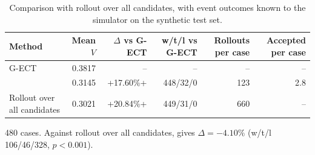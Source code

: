 \begin{table}
\centering
\begin{threeparttable}
\caption{Comparison with rollout over all candidates, with event outcomes known to the simulator on the synthetic test set.}
\label{tab:v9-reference}
\footnotesize
\setlength{\tabcolsep}{4pt}
\begin{tabular*}{\textwidth}{@{\extracolsep{\fill}}lrrrrr@{}}
\toprule
Method & Mean $V$ & $\Delta$ vs G-ECT & w/t/l vs G-ECT & Rollouts per case & Accepted per case \\
\midrule
G-ECT & 0.3817 & -- & -- & -- & -- \\
\pgnd{} & 0.3145 & +17.60\%+ & 448/32/0 & 123 & 2.8 \\
Rollout over all candidates & 0.3021 & +20.84\%+ & 449/31/0 & 660 & -- \\
\bottomrule
\end{tabular*}
\begin{tablenotes}\footnotesize
\item 480 cases. Against rollout over all candidates, \pgnd{} gives $\Delta=-4.10\%$ (w/t/l 106/46/328, $p<0.001$).
\end{tablenotes}
\end{threeparttable}
\end{table}
